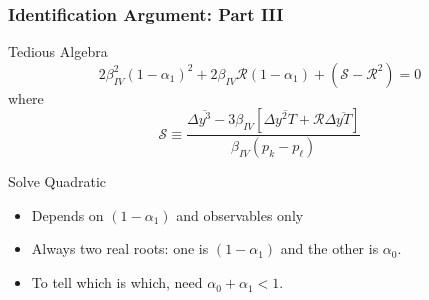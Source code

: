 \documentclass{beamer}
\begin{document}
\begin{frame}
  \frametitle{Identification Argument: Part III}
  \begin{block}{Tedious Algebra}
    \vspace{-1em}
    \[2\beta_{IV}^2 (1-\alpha_1)^2 + 2 \beta_{IV} \mathcal{R}(1-\alpha_1) + (\mathcal{S} -\mathcal{R}^2) = 0\]
  where
  \begin{equation*}
    \mathcal{S} \equiv \frac{\Delta\overline{y^3} - 3 \beta_{IV}\left[ \Delta\overline{y^2T}+\mathcal{R}\Delta\overline{yT} \right]}{\beta_{IV}(p_k - p_\ell)}
  \end{equation*}
  \end{block}

  \begin{block}{Solve Quadratic}
  \begin{itemize}
    \item Depends on $(1-\alpha_1)$ and observables only
    \item Always two real roots: one is $(1-\alpha_1)$ and the other is $\alpha_0$.
    \item To tell which is which, need $\alpha_0 + \alpha_1 < 1$.
  \end{itemize}
  \end{block}
\end{frame}
%
\end{document}
